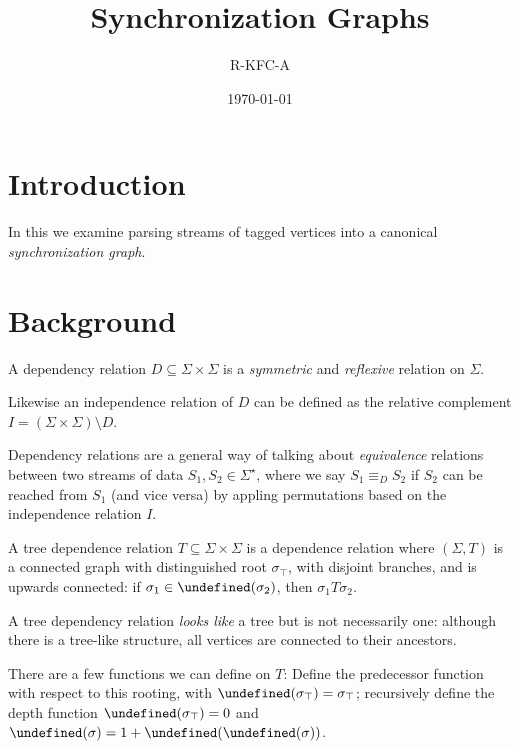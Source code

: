 \documentclass[12pt]{article}
\title{Synchronization Graphs}
\author{R-KFC-A}
\date{\today}
\date{}
\let\pred\undefined
\newcommand{\pred}{\mathbf{pred}}
\let\ancestors\undefined
\newcommand{\ancestors}{\mathbf{ancestors}}
\let\depth\undefined
\newcommand{\depth}{\mathbf{depth}}
\begin{document}
\maketitle

\section{Introduction}

In this we examine parsing streams of tagged vertices
into a canonical \textit{synchronization graph}.


\section{Background}

\begin{definition}
  A dependency relation \(D \subseteq \Sigma \times \Sigma\)
  is a \textit{symmetric} and \textit{reflexive}
  relation on \(\Sigma\).
\end{definition}

Likewise an independence relation of \(D\) can be defined as
the relative complement
\(I = (\Sigma \times \Sigma) \setminus D\).

Dependency relations are a general way of talking about
\textit{equivalence} relations between two streams of data
\(S_1, S_2 \in \Sigma^\star\),
where we say \(S_1 \equiv_D S_2\) if \(S_2\) can be reached from \(S_1\)
(and vice versa) by appling permutations based on
the independence relation \(I\).

\begin{definition}
  A tree dependence relation \(T \subseteq \Sigma \times \Sigma\)
  is a dependence relation where
  \((\Sigma, T)\) is a connected
  graph with distinguished root \(\sigma_\top\),
  with disjoint branches,
  and is upwards connected:
  if \(\sigma_1 \in \ancestors(\sigma_2)\), then \(\sigma_1 T \sigma_2\).
\end{definition}

A tree dependency relation \textit{looks like}
a tree but is not necessarily one:
although there is a tree-like structure,
all vertices are connected to their ancestors.

There are a few functions we can define on \(T\):
Define the predecessor function with respect to this rooting,
with \(\pred(\sigma_\top) = \sigma_\top\);
recursively define the depth function
\(\depth(\sigma_\top) = 0\) and
\(\depth(\sigma) = 1 + \depth(\pred(\sigma))\).
\end{document}
